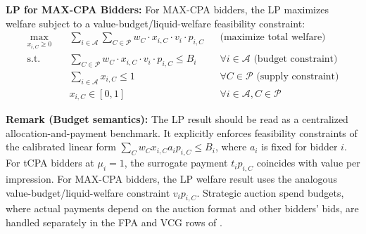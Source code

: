 \documentclass{article}
\theoremstyle{plain}
\theoremstyle{definition}
\theoremstyle{remark}
\newcommand{\cA}{\mathcal{A}}
\newcommand{\cP}{\mathcal{P}}
\begin{document}
\textbf{LP for MAX-CPA Bidders:} For MAX-CPA bidders, the LP maximizes welfare subject to a value-budget/liquid-welfare feasibility constraint:
\begin{align}
\max_{x_{i,C} \geq 0} \quad & \sum_{i \in \cA} \sum_{C \in \cP} w_C \cdot x_{i,C} \cdot v_i \cdot p_{i,C} && \text{(maximize total welfare)} \\
\text{s.t.} \quad & \sum_{C \in \cP} w_C \cdot x_{i,C} \cdot v_i \cdot p_{i,C} \leq B_i && \forall i \in \cA \text{ (budget constraint)} \\
& \sum_{i \in \cA} x_{i,C} \leq 1 && \forall C \in \cP \text{ (supply constraint)} \\
& x_{i,C} \in [0,1] && \forall i \in \cA, C \in \cP
\end{align}

\textbf{Remark (Budget semantics):} The LP result should be read as a centralized allocation-and-payment benchmark. It explicitly enforces feasibility constraints of the calibrated linear form $\sum_C w_C x_{i,C} a_i p_{i,C} \le B_i$, where $a_i$ is fixed for bidder $i$. For tCPA bidders at $\mu_i=1$, the surrogate payment $t_i p_{i,C}$ coincides with value per impression. For MAX-CPA bidders, the LP welfare result uses the analogous value-budget/liquid-welfare constraint $v_i p_{i,C}$. Strategic auction spend budgets, where actual payments depend on the auction format and other bidders' bids, are handled separately in the FPA and VCG rows of .
\end{document}
